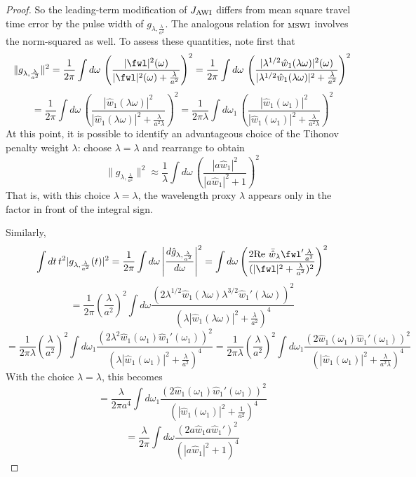 \begin{proof}
So the leading-term modification of $J_{\rm AWI}$ differs from mean square
travel time error by the pulse width of
$g_{\lambda,\frac{\lambda}{a^2}}$. The analogous relation for $_{\rm
  MSWI}$ involves the norm-squared as well. To assess these
quantities, note first that
\[
  \|g_{\lambda,\frac{\lambda}{a^2}}\|^2 =\frac{1}{2\pi} \int d\omega\,
  \left(\frac{|\fwl|^2(\omega)}{|\fwl|^2(\omega) + \frac{\lambda}{a^2}}\right)^2
=\frac{1}{2\pi} \int d\omega\,
  \left(\frac{|\lambda^{1/2}\hat{w}_1(\lambda
      \omega)|^2(\omega)}{|\lambda^{1/2}\hat{w}_1(\lambda
      \omega)|^2 + \frac{\lambda}{a^2}}\right)^2
\]
\[
=\frac{1}{2\pi}\int d\omega\,
  \left(\frac{|\hat{w}_1(\lambda
      \omega)|^2}{|\hat{w}_1(\lambda
      \omega)|^2 + \frac{\lambda}{a^2\lambda}}\right)^2
=  \frac{1}{2\pi \lambda} \int d\omega_1\,
  \left(\frac{|\hat{w}_1(\omega_1)|^2}{|\hat{w}_1(\omega_1)|^2 + \frac{\lambda}{a^2\lambda}}\right)^2
\]
At this point, it is possible to identify an advantageous choice of
the Tihonov penalty weight $\lambda$: choose
$\lambda = \lambda$  and rearrange to obtain
\begin{equation}
  \label{eqn:g0}
  \|g_{\lambda,\frac{\lambda}{a^2}}\|^2 \approx \frac{1}{\lambda} \int d\omega\,
  \left(\frac{|a\hat{w}_1|^2}{|a\hat{w}_1|^2 + 1}\right)^2
\end{equation}
That is, with this choice $\lambda = \lambda$, the wavelength proxy
$\lambda$ appears only in the factor in front of the integral sign.

Similarly,
\[
  \int dt\, t^2|g_{\lambda,\frac{\lambda}{a^2}}(t)|^2 = \frac{1}{2\pi} \int d\omega
  \left|\frac{d\hat{g}_{\lambda,\frac{\lambda}{a^2}}}{d\omega}\right|^2
  =  \int d\omega  \left(\frac{2 \mbox{Re }\bar{\hat{w}}_{\lambda}\fwl' 
    \frac{\lambda}{a^2}}{(|\fwl|^2 + \frac{\lambda}{a^2})^2}\right)^2
\]
\[
  =\frac{1}{2\pi}\left(\frac{\lambda}{a^2}\right)^2 \int d\omega \frac{(2 \lambda^{1/2}\hat{w}_1(\lambda
    \omega)\lambda^{3/2}\hat{w}_1'(\lambda \omega))^2}{(\lambda|\hat{w}_1(\lambda
    \omega)|^2 + \frac{\lambda}{a^2})^4}
\]
\[
  =\frac{1}{2\pi\lambda}\left(\frac{\lambda}{a^2}\right)^2\int d\omega_1 \frac{(2 \lambda^2\hat{w}_1(\omega_1)\hat{w}_1'( \omega_1))^2}{(\lambda|\hat{w}_1(
    \omega_1)|^2 + \frac{\lambda}{a^2})^4}
  =\frac{1}{2 \pi \lambda}\left(\frac{\lambda}{a^2}\right)^2\int d\omega_1
  \frac{(2\hat{w}_1(\omega_1)\hat{w}_1'( \omega_1)
    )^2}{\left(|\hat{w}_1(\omega_1)|^2 + \frac{\lambda}{a^2\lambda}\right)^4}
\]
With the choice $\lambda = \lambda$, this becomes
\[
  =\frac{\lambda}{2\pi a^4}\int d\omega_1
  \frac{(2\hat{w}_1(\omega_1)\hat{w}_1'( \omega_1)
    )^2}{\left(|\hat{w}_1(\omega_1)|^2 + \frac{1}{a^2}\right)^4}
\]
\begin{equation}
  \label{eqn:g1}
 = \frac{\lambda}{2\pi} \int d\omega
  \frac{(2a\hat{w}_1a\hat{w}_1'
    )^2}{\left(|a\hat{w}_1|^2 + 1\right)^4}
\end{equation}


\end{proof}
